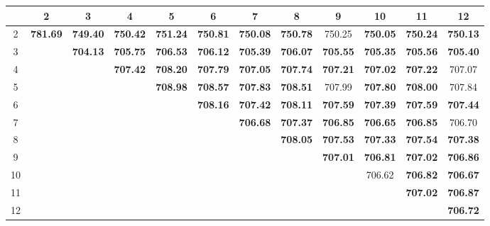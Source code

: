 \documentclass{article}
\begin{document}
    \begin{tcolorbox}[colback=white!95!gray, colframe=black!75, boxrule=0.8pt, arc=4pt, width=\textwidth, title=Two Loop Calculation ]
    	\begin{table}[H]
		\centering
		\begin{adjustbox}{max width=\textwidth,max height=2\textheight}
\begin{tabular}{|c|c|c|c|c|c|c|c|c|c|c|c|}
  \hline
  & 2       & 3       & 4       & 5       & 6       & 7       & 8       & 9       & 10      & 11      & 12      \\
  \hline
  2 & \textbf{781.69} & \textbf{749.40} & \textbf{750.42} & \textbf{751.24} & \textbf{750.81} & \textbf{750.08} & \textbf{750.78} & 750.25 & \textbf{750.05} & \textbf{750.24} & \textbf{750.13} \\
  \hline
  3 &               & \textbf{704.13} & \textbf{705.75} & \textbf{706.53} & \textbf{706.12} & \textbf{705.39} & \textbf{706.07} & \textbf{705.55} & \textbf{705.35} & \textbf{705.56} & \textbf{705.40} \\
  \hline
  4 &               &               & \textbf{707.42} & \textbf{708.20} & \textbf{707.79} & \textbf{707.05} & \textbf{707.74} & \textbf{707.21} & \textbf{707.02} & \textbf{707.22} & 707.07 \\
  \hline
  5 &               &               &               & \textbf{708.98} & \textbf{708.57} & \textbf{707.83} & \textbf{708.51} & 707.99 & \textbf{707.80} & \textbf{708.00} & 707.84 \\
  \hline
  6 &               &               &               &               & \textbf{708.16} & \textbf{707.42} & \textbf{708.11} & \textbf{707.59} & \textbf{707.39} & \textbf{707.59} & \textbf{707.44} \\
  \hline
  7 &               &               &               &               &               & \textbf{706.68} & \textbf{707.37} & \textbf{706.85} & \textbf{706.65} & \textbf{706.85} & 706.70 \\
  \hline
  8 &               &               &               &               &               &               & \textbf{708.05} & \textbf{707.53} & \textbf{707.33} & \textbf{707.54} & \textbf{707.38} \\
  \hline
  9 &               &               &               &               &               &               &               & \textbf{707.01} & \textbf{706.81} & \textbf{707.02} & \textbf{706.86} \\
  \hline
  10 &              &               &               &               &               &               &               &               & 706.62 & \textbf{706.82} & \textbf{706.67} \\
  \hline
  11 &              &               &               &               &               &               &               &               &               & \textbf{707.02} & \textbf{706.87} \\
  \hline
  12 &              &               &               &               &               &               &               &               &               &               & \textbf{706.72} \\
  \hline
\end{tabular}


\end{adjustbox}
\end{table}
\end{tcolorbox}
\end{document}
